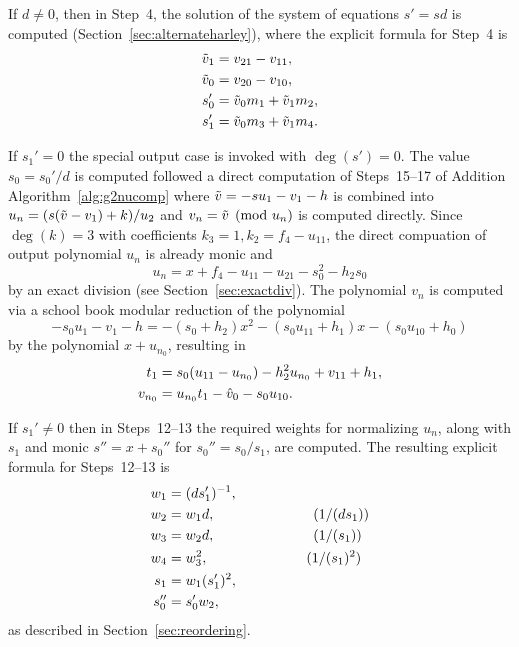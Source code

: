 If $d \neq 0$, then in Step~4, the solution of the system of equations $s' = sd$
is computed (Section~\ref{sec:alternateharley}), where the explicit formula
for Step~4 is
\begin{align*}
    \tilde{v}_1 &= v_{21} - v_{11},\\
    \tilde{v}_0 &= v_{20} - v_{10},\\
    s_0' &= \tilde{v}_0m_1 + \tilde{v}_1m_2,\\
    s_1' &= \tilde{v}_0m_3 + \tilde{v}_1m_4.
\end{align*}

If $s_1' = 0$ the special output case is invoked with $\deg(s') = 0$. The value
$s_0 = s_0'/d$ is computed followed a direct computation of Steps~15--17 of
Addition Algorithm~\ref{alg:g2nucomp} where $\tilde{v} = -su_1 - v_1 - h$ is
combined into $u_n =(s(\tilde{v} - v_1) + k)/u_2$ and $v_n = \tilde{v} \pmod{u_n}$ is
computed directly. Since $\deg(k) = 3$ with coefficients $k_3 = 1, k_2 = f_4 -
u_{11}$, the direct compuation of output polynomial $u_n$ is already monic and
$$u_n = x + f_4 - u_{11} - u_{21} - s_0^2 - h_2s_0$$ by an exact division (see
Section~\ref{sec:exactdiv}). The polynomial $v_n$
is computed via a school book modular reduction of the polynomial $$-s_0u_1 - v_1 - h =
-(s_0 + h_2)x^2 - (s_0u_{11} + h_1)x - (s_0u_{10} + h_0)$$ by the polynomial $x
+ u_{n_0}$, resulting in
\begin{align*} t_1 &= s_0(u_{11} - u_{n_0}) - h_2^2u_{n_0} + v_{11} + h_1,\\
v_{n_0} &= u_{n_0}t_1 - \hat{v}_0 - s_0u_{10}.    
\end{align*}

If $s_1' \neq 0$ then in Steps~12--13 the required weights for normalizing
$u_n$, along with $s_1$ and monic $s'' = x + s_0''$ for $s_0'' = s_0/s_1$, are
computed. The resulting explicit formula for Steps~12--13 is 
\begin{align*} 
    w_1 &= (ds_1')^{-1},\\
    w_2 &= w_1d, \quad\quad\quad\quad\quad\quad\quad (1/(ds_1))\\
    w_3 &= w_2d, \quad\quad\quad\quad\quad\quad\quad (1/(s_1))\\
    w_4 &= w_3^2, \quad\quad\quad\quad\quad\quad\quad (1/(s_1)^2)\\
    s_1 &= w_1(s_1')^2,\\
    s_0'' &= s_0'w_2,
\end{align*} as described in Section~\ref{sec:reordering}.

